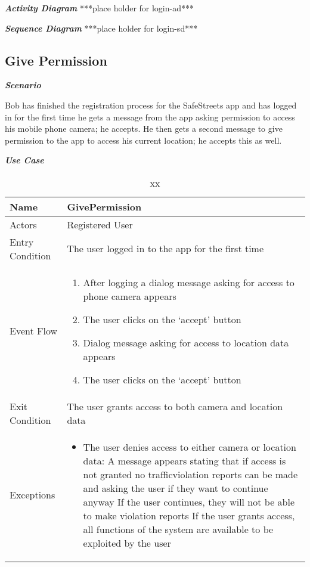 \emph{\textbf{Activity Diagram}}
***place holder for login-ad***

\emph{\textbf{Sequence Diagram}}
***place holder for login-sd***

\subsection{Give Permission}

\emph{\textbf{Scenario}}

Bob has finished the registration process for the SafeStreets app and has logged in for the first time he gets a message from the app asking permission to access his mobile phone camera; he accepts. He then gets a second message to give permission to the app to access his current location; he accepts this as well.

\emph{\textbf{Use Case}}

\begin{table}[!hbtp]
\footnotesize
\centering
\settowidth{}
\setlength\extrarowheight{2pt}
\begin{tabulary}{\textwidth}{|J|J|}
\hline
Name            & GivePermission \\
\hline 
Actors          & Registered User \\
\hline 
Entry Condition & The user logged in to the app for the first time \\
\hline 
Event Flow      & 
\begin{minipage}[t]{0.7\textwidth}
\begin{enumerate} 
\item After logging a dialog message asking for access to phone camera appears
\item The user clicks on the ‘accept’ button
\item Dialog message asking for access to location data appears
\item The user clicks on the ‘accept’ button
\end{enumerate}
\end{minipage}\\
\hline

Exit Condition  & The user grants access to both camera and location data \\
\hline 
Exceptions      & 
\begin{minipage}[t]{0.8\textwidth}
\begin{itemize} 
\item The user denies access to either camera or location data: A message appears stating that if access is not granted no trafficviolation reports can be made and asking the user if they want to continue anyway If the user continues, they will not be able to make violation reports If the user grants access, all functions of the system are available to be exploited by the user
\end{itemize}
\end{minipage}\\
\hline
\end{tabulary}
\caption{\label{tab:xx}xx}
\end{table}

